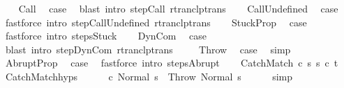 \begin{isabellebody}
\isamarkupfalse%
\isanewline
\ \ \isamarkupfalse%
\ Call\ \isamarkupfalse%
\ {\isacharquery}case\ \isamarkupfalse%
\ {\isacharparenleft}blast\ intro{\isacharcolon}\ step{\isachardot}Call\ rtranclp{\isacharunderscore}trans{\isacharparenright}\isanewline
{}\isamarkupfalse%
\isanewline
\ \ \isamarkupfalse%
\ CallUndefined\ \isamarkupfalse%
\ {\isacharquery}case\ \isamarkupfalse%
\ {\isacharparenleft}fastforce\ intro{\isacharcolon}\ step{\isachardot}CallUndefined\ rtranclp{\isacharunderscore}trans{\isacharparenright}\isanewline
{}\isamarkupfalse%
\isanewline
\ \ \isamarkupfalse%
\ StuckProp\ \isamarkupfalse%
\ {\isacharquery}case\ \isamarkupfalse%
\ {\isacharparenleft}fastforce\ intro{\isacharcolon}\ steps{\isacharunderscore}Stuck{\isacharparenright}\isanewline
{}\isamarkupfalse%
\isanewline
\ \ \isamarkupfalse%
\ DynCom\ \isamarkupfalse%
\ {\isacharquery}case\ \isamarkupfalse%
\ {\isacharparenleft}blast\ intro{\isacharcolon}\ step{\isachardot}DynCom\ rtranclp{\isacharunderscore}trans{\isacharparenright}\isanewline
{}\isamarkupfalse%
\isanewline
\ \ \ \isamarkupfalse%
\ Throw\ \isamarkupfalse%
\ {\isacharquery}case\ \isamarkupfalse%
\ simp\ \isanewline
{}\isamarkupfalse%
\isanewline
\ \ \isamarkupfalse%
\ AbruptProp\ \isamarkupfalse%
\ {\isacharquery}case\ \isamarkupfalse%
\ {\isacharparenleft}fastforce\ intro{\isacharcolon}\ steps{\isacharunderscore}Abrupt{\isacharparenright}\isanewline
{}\isamarkupfalse%
\isanewline
\ \ \isamarkupfalse%
\ {\isacharparenleft}CatchMatch\ c\ s\ s{\isacharprime}\ c\ t{\isacharparenright}\isanewline
\ \ \isamarkupfalse%
\ CatchMatch{\isachardot}hyps\ {\isacharparenleft}{}{\isacharparenright}\isanewline
\ \ \isamarkupfalse%
\ {\isachardoublequoteopen}{\isasymGamma}{\isasymturnstile}\ {\isacharparenleft}c\ Normal\ s{\isacharparenright}\ {\isasymrightarrow}\isactrlsup {\isacharasterisk}\ {\isacharparenleft}Throw{\isacharcomma}\ Normal\ s{\isacharprime}{\isacharparenright}{\isachardoublequoteclose}\isanewline
\ \ \ \ \isamarkupfalse%
\ simp\isanewline
\ \ \isamarkupfalse%

\end{isabellebody}
